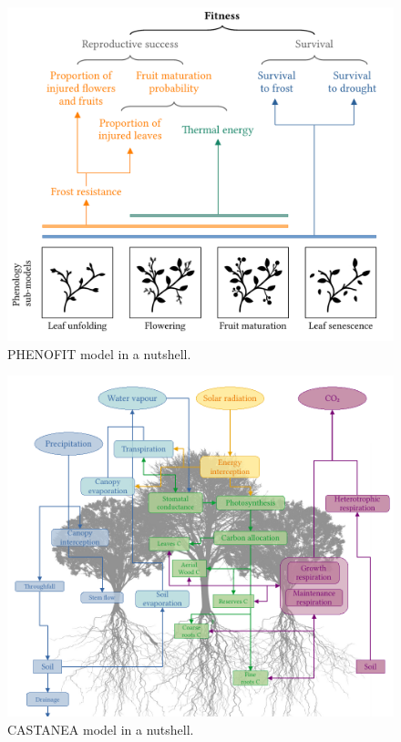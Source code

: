 \documentclass[11pt,]{article}
\begin{document}
\begin{figure}[htbp]

{\centering \includegraphics{figs/files/phenofit} 

}

\caption{PHENOFIT model in a nutshell.}\label{fig:phenofit_model}
\end{figure}

\begin{figure}[htbp]

{\centering \includegraphics{figs/files/castanea_schema} 

}

\caption{CASTANEA model in a nutshell.}\label{fig:phenofit_model}
\end{figure}
\end{document}
